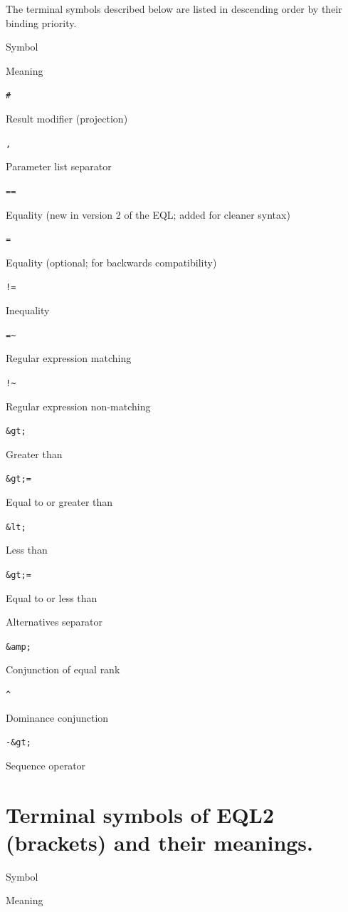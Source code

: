 \documentclass[]{book}
\theoremstyle{definition}
\theoremstyle{definition}
\theoremstyle{definition}
\theoremstyle{remark}
\begin{document}
The terminal symbols described below are listed in descending order by
their binding priority.

Symbol

Meaning

\texttt{\#}

Result modifier (projection)

\texttt{,}

Parameter list separator

\texttt{==}

Equality (new in version 2 of the EQL; added for cleaner syntax)

\texttt{=}

Equality (optional; for backwards compatibility)

\texttt{!=}

Inequality

\texttt{=\textasciitilde{}}

Regular expression matching

\texttt{!\textasciitilde{}}

Regular expression non-matching

\texttt{\&gt;}

Greater than

\texttt{\&gt;=}

Equal to or greater than

\texttt{\&lt;}

Less than

\texttt{\&gt;=}

Equal to or less than

\texttt{\textbar{}}

Alternatives separator

\texttt{\&amp;}

Conjunction of equal rank

\texttt{\^{}}

Dominance conjunction

\texttt{-\&gt;}

Sequence operator

\hypertarget{terminal-symbols-of-eql2-brackets-and-their-meanings.}{%
\section{Terminal symbols of EQL2 (brackets) and their
meanings.}\label{terminal-symbols-of-eql2-brackets-and-their-meanings.}}

Symbol

Meaning

\texttt{\textquotesingle{}}
\end{document}
